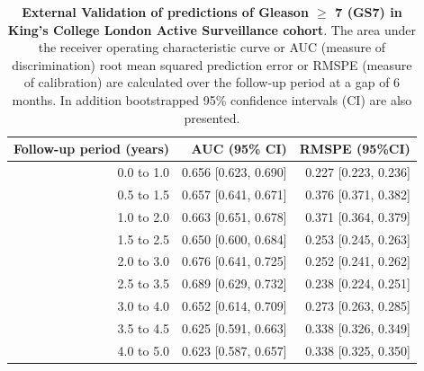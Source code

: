 \begin{table}[!htb]
\small\sf\centering
\caption{\textbf{External Validation of predictions of Gleason $\geq$ 7 (GS7) in King's College London Active Surveillance cohort}. The area under the receiver operating characteristic curve or AUC (measure of discrimination) root mean squared prediction error or RMSPE (measure of calibration) are calculated over the follow-up period at a gap of 6 months. In addition bootstrapped 95\% confidence intervals (CI) are also presented.}
\label{tab:AUC_PE_KCL}
\begin{tabular}{r|r|r}
\hline
\hline
Follow-up period (years) & AUC (95\% CI) & RMSPE (95\%CI)\\ 
\hline
0.0 to 1.0 & 0.656 [0.623, 0.690] & 0.227 [0.223, 0.236]\\
0.5 to 1.5 & 0.657 [0.641, 0.671] & 0.376 [0.371, 0.382]\\
1.0 to 2.0 & 0.663 [0.651, 0.678] & 0.371 [0.364, 0.379]\\
1.5 to 2.5 & 0.650 [0.600, 0.684] & 0.253 [0.245, 0.263]\\
2.0 to 3.0 & 0.676 [0.641, 0.725] & 0.252 [0.241, 0.262]\\
2.5 to 3.5 & 0.689 [0.629, 0.732] & 0.238 [0.224, 0.251]\\
3.0 to 4.0 & 0.652 [0.614, 0.709] & 0.273 [0.263, 0.285]\\
3.5 to 4.5 & 0.625 [0.591, 0.663] & 0.338 [0.326, 0.349]\\
4.0 to 5.0 & 0.623 [0.587, 0.657] & 0.338 [0.325, 0.350]\\
\hline
\end{tabular}	
\end{table}